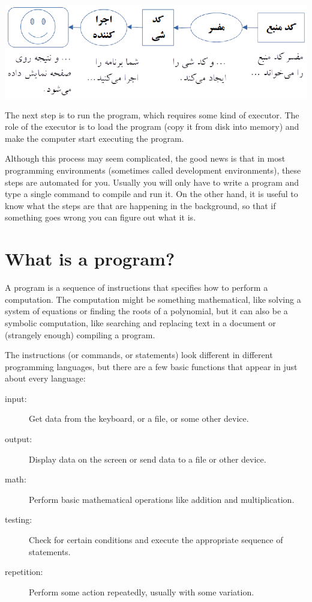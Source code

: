 \vspace{0.1in}
\centering\includegraphics{compile_fa.eps}
\vspace{0.1in}

The next step is to run the program, which requires some kind
of executor.  The role of the executor is to load the program
(copy it from disk into memory) and make the computer start
executing the program.

Although this process may seem complicated, the good news is that in
most programming environments (sometimes called development
environments), these steps are automated for you.  Usually you will
only have to write a program and type a single command to compile and
run it.  On the other hand, it is useful to know what the steps are
that are happening in the background, so that if something goes wrong
you can figure out what it is.

\section{What is a program?}

A program is a sequence of instructions that specifies how to perform
a computation.  The computation might be something mathematical, like
solving a system of equations or finding the roots of a polynomial,
but it can also be a symbolic computation, like searching and
replacing text in a document or (strangely enough) compiling a
program.


The instructions (or commands, or statements) look different in
different programming languages, but there are a few basic functions
that appear in just about every language:

\begin{description}

\item[input:] Get data from the keyboard, or a file, or some
other device.

\item[output:] Display data on the screen or send data to a
file or other device.

\item[math:] Perform basic mathematical operations like addition and
multiplication.

\item[testing:] Check for certain conditions and execute the
appropriate sequence of statements.

\item[repetition:] Perform some action repeatedly, usually with
some variation.

\end{description}

